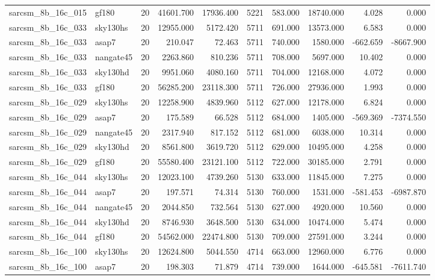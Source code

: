 \begin{longtable}{llrrrrrrrr}
sarcsm\_8b\_16c\_015 & gf180 & 20 & 41601.700 & 17936.400 & 5221 & 583.000 & 18740.000 & 4.028 & 0.000 \\
sarcsm\_8b\_16c\_033 & sky130hs & 20 & 12955.000 & 5172.420 & 5711 & 691.000 & 13573.000 & 6.583 & 0.000 \\
sarcsm\_8b\_16c\_033 & asap7 & 20 & 210.047 & 72.463 & 5711 & 740.000 & 1580.000 & -662.659 & -8667.900 \\
sarcsm\_8b\_16c\_033 & nangate45 & 20 & 2263.860 & 810.236 & 5711 & 708.000 & 5697.000 & 10.402 & 0.000 \\
sarcsm\_8b\_16c\_033 & sky130hd & 20 & 9951.060 & 4080.160 & 5711 & 704.000 & 12168.000 & 4.072 & 0.000 \\
sarcsm\_8b\_16c\_033 & gf180 & 20 & 56285.200 & 23118.300 & 5711 & 726.000 & 27936.000 & 1.993 & 0.000 \\
sarcsm\_8b\_16c\_029 & sky130hs & 20 & 12258.900 & 4839.960 & 5112 & 627.000 & 12178.000 & 6.824 & 0.000 \\
sarcsm\_8b\_16c\_029 & asap7 & 20 & 175.589 & 66.528 & 5112 & 684.000 & 1405.000 & -569.369 & -7374.550 \\
sarcsm\_8b\_16c\_029 & nangate45 & 20 & 2317.940 & 817.152 & 5112 & 681.000 & 6038.000 & 10.314 & 0.000 \\
sarcsm\_8b\_16c\_029 & sky130hd & 20 & 8561.800 & 3619.720 & 5112 & 629.000 & 10495.000 & 4.258 & 0.000 \\
sarcsm\_8b\_16c\_029 & gf180 & 20 & 55580.400 & 23121.100 & 5112 & 722.000 & 30185.000 & 2.791 & 0.000 \\
sarcsm\_8b\_16c\_044 & sky130hs & 20 & 12023.100 & 4739.260 & 5130 & 633.000 & 11845.000 & 7.275 & 0.000 \\
sarcsm\_8b\_16c\_044 & asap7 & 20 & 197.571 & 74.314 & 5130 & 760.000 & 1531.000 & -581.453 & -6987.870 \\
sarcsm\_8b\_16c\_044 & nangate45 & 20 & 2044.850 & 732.564 & 5130 & 627.000 & 4920.000 & 10.560 & 0.000 \\
sarcsm\_8b\_16c\_044 & sky130hd & 20 & 8746.930 & 3648.500 & 5130 & 634.000 & 10474.000 & 5.474 & 0.000 \\
sarcsm\_8b\_16c\_044 & gf180 & 20 & 54562.000 & 22474.800 & 5130 & 709.000 & 27591.000 & 3.244 & 0.000 \\
sarcsm\_8b\_16c\_100 & sky130hs & 20 & 12624.800 & 5044.550 & 4714 & 663.000 & 12960.000 & 6.776 & 0.000 \\
sarcsm\_8b\_16c\_100 & asap7 & 20 & 198.303 & 71.879 & 4714 & 739.000 & 1644.000 & -645.581 & -7611.740 \\

\end{longtable}
